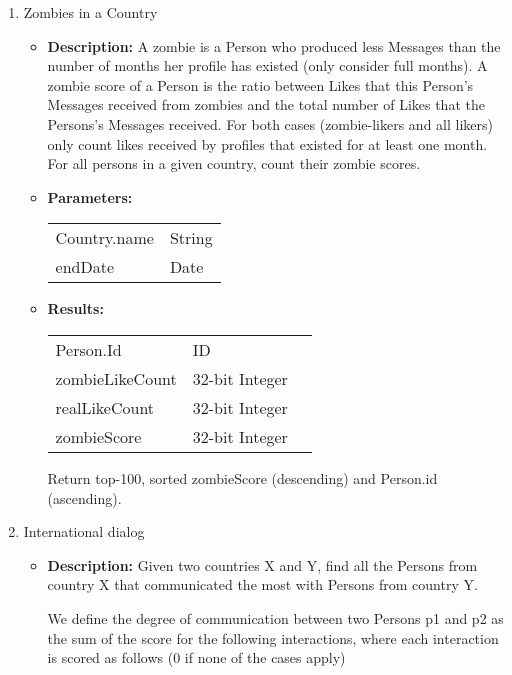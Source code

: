 {\begin{enumerate}
            \item Zombies in a Country 
            \begin{itemize}
                \item \textbf{Description:}
                    A zombie is a Person who produced less Messages than the number of months her profile has existed
                    (only consider full months).  A zombie score of a Person is the ratio between Likes that this
                    Person's Messages received from zombies and the total number of Likes that the Persons's Messages
                    received.  For both cases (zombie-likers and all likers) only count likes received by profiles that
                    existed for at least one month.  For all persons in a given country, count their zombie scores.
                \item \textbf{Parameters:} \\
                    \begin{tabular}{ll}
                      Country.name & String  \\
                      endDate & Date \\
                    \end{tabular}
                \item \textbf{Results:} \\
                    \begin{tabular}{lll}
                      Person.Id & ID & \\
                      zombieLikeCount & 32-bit Integer & \\
                      realLikeCount & 32-bit Integer & \\
                      zombieScore & 32-bit Integer & \\
                    \end{tabular}
                    Return top-100, sorted zombieScore (descending) and Person.id (ascending).
                    \end{itemize}

            \item International dialog 
            \begin{itemize}
                \item \textbf{Description:}
                  Given two countries X and Y, find all the Persons from country X that communicated the most with
                  Persons from country Y.

                  We define the degree of communication between two Persons p1 and p2 as the sum of the score for the
                  following interactions, where each interaction is scored as follows  (0 if none of the cases apply)


\end{itemize}
\end{enumerate}}
